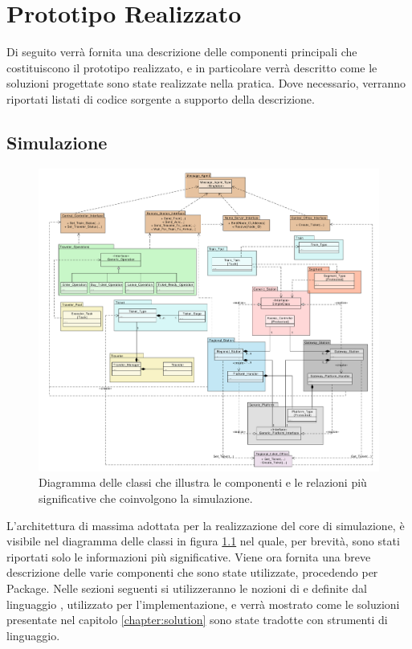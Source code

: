 \newpage
\chapter {Prototipo Realizzato}

Di seguito verrà fornita una descrizione delle componenti principali che costituiscono il prototipo realizzato, e in particolare verrà descritto come le soluzioni progettate sono state realizzate nella pratica. Dove necessario, verranno riportati listati di codice sorgente a supporto della descrizione.

\section{Simulazione}

	\begin{figure}[htbp]
		\includegraphics[scale=0.39,trim= 100mm 0mm 0mm 0mm]{imgs/Simplified_Class_Diagram.pdf}
		\caption{\footnotesize{Diagramma delle classi che illustra le componenti e le relazioni più significative che coinvolgono la simulazione.}}
		\label{img:class_diagram}
	\end{figure}

L'architettura di massima adottata per la realizzazione del core di simulazione, è visibile nel diagramma delle classi in figura \ref{img:class_diagram} nel quale, per brevità, sono stati riportati solo le informazioni più significative.
	Viene ora fornita una breve descrizione delle varie componenti che sono state utilizzate, procedendo per Package. Nelle sezioni seguenti si utilizzeranno le nozioni di  e  definite dal linguaggio , utilizzato per l'implementazione, e verrà mostrato come le soluzioni presentate nel capitolo \ref{chapter:solution} sono state tradotte con strumenti di linguaggio.

